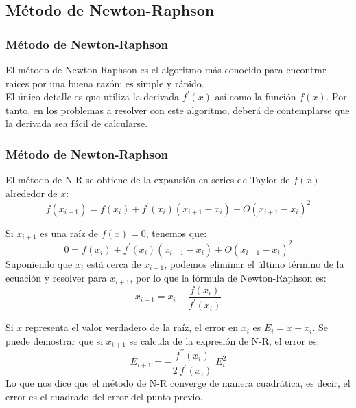 \subsection{Método de Newton-Raphson}
\begin{frame}
\frametitle{Método de Newton-Raphson}
El método de Newton-Raphson es el algoritmo más conocido para encontrar raíces por una buena razón: es simple y rápido.
\\
\medskip
El único detalle es que utiliza la derivada $f^{\prime}(x)$ así como la función $f(x)$. Por tanto, en los problemas a resolver con este algoritmo, deberá de contemplarse que la derivada sea fácil de calcularse.
\end{frame}
\begin{frame}
\frametitle{Método de Newton-Raphson}
El método de N-R se obtiene de la expansión en series de Taylor de $f(x)$ alrededor de $x$:
\[ f(x_{i + 1})  = f(x_{i}) + f^{\prime}(x_{i})(x_{i + 1} - x_{i}) + O(x_{i + 1} - x_{i})^{2}\]
\end{frame}
\begin{frame}
Si $x_{i + 1}$ es una raíz de $f(x)=0$, tenemos que:
\[ 0 = f(x_{i}) + f^{\prime}(x_{i})(x_{i + 1} - x_{i}) + O(x_{i + 1} - x_{i})^{2} \]
Suponiendo que $x_{i}$ está cerca de $x_{i + 1}$, podemos eliminar el último término de la ecuación y resolver para $x_{i+1}$, por lo que la fórmula de Newton-Raphson es:
\[ x_{i+1} = x_{i} - \dfrac{f(x_{i})}{f^{\prime}(x_{i})} \]
\end{frame}
\begin{frame}
Si $x$ representa el valor verdadero de la raíz, el error en $x_{i}$ es $E_{i} =x - x_{i}$. Se puede demostrar que si $x_{i+1}$ se calcula de la expresión de N-R, el error es:
\[ E_{i+1} = - \dfrac{f^{\prime \prime}(x_{i})}{2 \: f^{\prime}(x_{i})} \; E_{i}^{2}\]
Lo que nos dice que el método de N-R converge de manera cuadrática, es decir, el error es el cuadrado del error del punto previo.
\end{frame}
